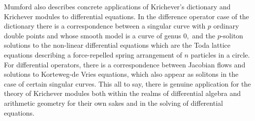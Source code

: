 \documentclass[12pt]{amsart}
\begin{document}
	Mumford also describes concrete applications of Krichever's dictionary and Krichever modules to differential equations. In the difference operator case of the dictionary there is a correspondence between a singular curve with $p$ ordinary double points and whose smooth model is a curve of genus $0,$ and the $p$-soliton solutions to the non-linear differential equations which are the Toda lattice equations describing a force-repelled spring arrangement of $n$ particles in a circle. For differential operators, there is a correspondence between Jacobian flows and solutions to Korteweg-de Vries equations, which also appear as solitons in the case of certain singular curves. This all to say, there is genuine application for the theory of Krichever modules both within the realms of differential algebra and arithmetic geometry for their own sakes and in the solving of differential equations. 
	
\newpage
 								
 						
\end{document}
